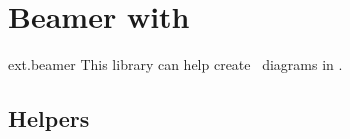 %
%
%

\section{Beamer with \tikzname}
\label{tikzlibrary:beamer}
\begin{tikzlibrary}{ext.beamer}
  This library can help create \tikzname\ diagrams in .
\end{tikzlibrary}

\subsection{Helpers}
